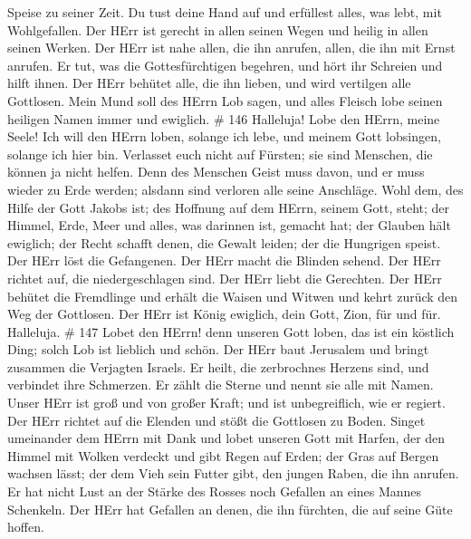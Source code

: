 Speise zu seiner Zeit.  Du tust deine Hand auf und
erfüllest alles, was lebt, mit Wohlgefallen.  Der HErr ist
gerecht in allen seinen Wegen und heilig in allen seinen Werken.
 Der HErr ist nahe allen, die ihn anrufen, allen, die ihn
mit Ernst anrufen.  Er tut, was die Gottesfürchtigen
begehren, und hört ihr Schreien und hilft ihnen.  Der HErr
behütet alle, die ihn lieben, und wird vertilgen alle Gottlosen.
 Mein Mund soll des HErrn Lob sagen, und alles Fleisch lobe
seinen heiligen Namen immer und ewiglich. \# 146  Halleluja!
Lobe den HErrn, meine Seele!  Ich will den HErrn loben,
solange ich lebe, und meinem Gott lobsingen, solange ich hier bin.
 Verlasset euch nicht auf Fürsten; sie sind Menschen, die
können ja nicht helfen.  Denn des Menschen Geist muss davon,
und er muss wieder zu Erde werden; alsdann sind verloren alle seine
Anschläge.  Wohl dem, des Hilfe der Gott Jakobs ist; des
Hoffnung auf dem HErrn, seinem Gott, steht;  der Himmel,
Erde, Meer und alles, was darinnen ist, gemacht hat; der Glauben hält
ewiglich;  der Recht schafft denen, die Gewalt leiden; der
die Hungrigen speist. Der HErr löst die Gefangenen.  Der
HErr macht die Blinden sehend. Der HErr richtet auf, die
niedergeschlagen sind. Der HErr liebt die Gerechten.  Der
HErr behütet die Fremdlinge und erhält die Waisen und Witwen und kehrt
zurück den Weg der Gottlosen.  Der HErr ist König ewiglich,
dein Gott, Zion, für und für. Halleluja. \# 147  Lobet den
HErrn! denn unseren Gott loben, das ist ein köstlich Ding; solch Lob ist
lieblich und schön.  Der HErr baut Jerusalem und bringt
zusammen die Verjagten Israels.  Er heilt, die zerbrochnes
Herzens sind, und verbindet ihre Schmerzen.  Er zählt die
Sterne und nennt sie alle mit Namen.  Unser HErr ist groß
und von großer Kraft; und ist unbegreiflich, wie er regiert.
 Der HErr richtet auf die Elenden und stößt die Gottlosen zu
Boden.  Singet umeinander dem HErrn mit Dank und lobet
unseren Gott mit Harfen,  der den Himmel mit Wolken verdeckt
und gibt Regen auf Erden; der Gras auf Bergen wachsen lässt;
 der dem Vieh sein Futter gibt, den jungen Raben, die ihn
anrufen.  Er hat nicht Lust an der Stärke des Rosses noch
Gefallen an eines Mannes Schenkeln.  Der HErr hat Gefallen
an denen, die ihn fürchten, die auf seine Güte hoffen. 
